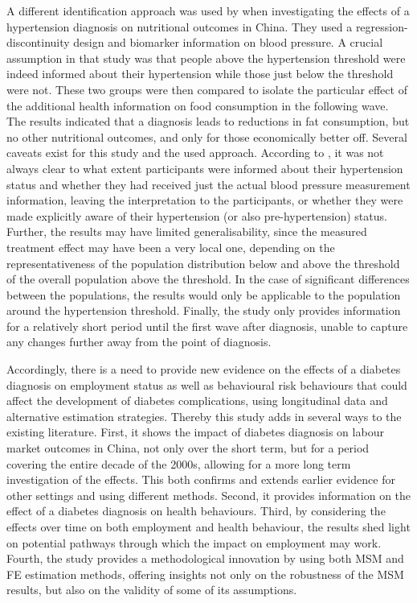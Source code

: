 A different identification approach was used by \textcite{Zhao2013a} when investigating the effects of a hypertension diagnosis on nutritional outcomes in China. They used a regression-discontinuity design and biomarker information on blood pressure. A crucial assumption in that study was that people above the hypertension threshold were indeed informed about their hypertension while those just below the threshold were not. These two groups were then compared to isolate the particular effect of the additional health information on food consumption in the following wave. The results indicated that a diagnosis leads to reductions in fat consumption, but no other nutritional outcomes, and only for those economically better off. Several caveats exist for this study and the used approach. According to \textcite{Zhao2013a}, it was not always clear to what extent participants were informed about their hypertension status and whether they had received just the actual blood pressure measurement information, leaving the interpretation to the participants, or whether they were made explicitly aware of their hypertension (or also pre-hypertension) status. Further, the results may have limited generalisability, since the measured treatment effect may have been a very local one, depending on the representativeness of the population distribution below and above the threshold of the overall population above the threshold. In the case of significant differences between the populations, the results would only be applicable to the population around the hypertension threshold. Finally, the study only provides information for a relatively short period until the first wave after diagnosis, unable to capture any changes further away from the point of diagnosis. 

Accordingly, there is a need to provide new evidence on the effects of a diabetes diagnosis on employment status as well as behavioural risk behaviours that could affect the development of diabetes complications, using longitudinal data and alternative estimation strategies. Thereby this study adds in several ways to the existing literature. First, it shows the impact of diabetes diagnosis on labour market outcomes in China, not only over the short term, but for a period covering the entire decade of the 2000s, allowing for a more long term investigation of the effects. This both confirms and extends earlier evidence for other settings and using different methods. Second, it provides information on the effect of a diabetes diagnosis on health behaviours. Third, by considering the effects over time on both employment and health behaviour, the results shed light on potential pathways through which the impact on employment may work.  Fourth, the study provides a methodological innovation by using both \ac{MSM} and \ac{FE} estimation methods, offering insights not only on the robustness of the \ac{MSM} results, but also on the validity of some of its assumptions.  


